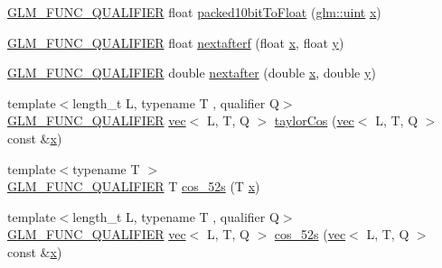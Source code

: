 \begin{DoxyCompactItemize}
\item 
\mbox{\hyperlink{setup_8hpp_a33fdea6f91c5f834105f7415e2a64407}{G\+L\+M\+\_\+\+F\+U\+N\+C\+\_\+\+Q\+U\+A\+L\+I\+F\+I\+ER}} float \mbox{\hyperlink{namespaceglm_1_1detail_afddea7fa02b61b01129777a21380edf4}{packed10bit\+To\+Float}} (\mbox{\hyperlink{group__core__precision_ga4fd29415871152bfb5abd588334147c8}{glm\+::uint}} \mbox{\hyperlink{_s_d_l__opengl_8h_ad0e63d0edcdbd3d79554076bf309fd47}{x}})
\item 
\mbox{\hyperlink{setup_8hpp_a33fdea6f91c5f834105f7415e2a64407}{G\+L\+M\+\_\+\+F\+U\+N\+C\+\_\+\+Q\+U\+A\+L\+I\+F\+I\+ER}} float \mbox{\hyperlink{namespaceglm_1_1detail_ab0eb795c482130b1d6c83470bdb031e6}{nextafterf}} (float \mbox{\hyperlink{_s_d_l__opengl_8h_ad0e63d0edcdbd3d79554076bf309fd47}{x}}, float \mbox{\hyperlink{_s_d_l__opengl_8h_a1675d9d7bb68e1657ff028643b4037e3}{y}})
\item 
\mbox{\hyperlink{setup_8hpp_a33fdea6f91c5f834105f7415e2a64407}{G\+L\+M\+\_\+\+F\+U\+N\+C\+\_\+\+Q\+U\+A\+L\+I\+F\+I\+ER}} double \mbox{\hyperlink{namespaceglm_1_1detail_a3c14f8400407e8b4cff5be12ceef2c1e}{nextafter}} (double \mbox{\hyperlink{_s_d_l__opengl_8h_ad0e63d0edcdbd3d79554076bf309fd47}{x}}, double \mbox{\hyperlink{_s_d_l__opengl_8h_a1675d9d7bb68e1657ff028643b4037e3}{y}})
\item 
{\footnotesize template$<$length\+\_\+t L, typename T , qualifier Q$>$ }\\\mbox{\hyperlink{setup_8hpp_a33fdea6f91c5f834105f7415e2a64407}{G\+L\+M\+\_\+\+F\+U\+N\+C\+\_\+\+Q\+U\+A\+L\+I\+F\+I\+ER}} \mbox{\hyperlink{structglm_1_1vec}{vec}}$<$ L, T, Q $>$ \mbox{\hyperlink{namespaceglm_1_1detail_a2cb8ceabe04661b078d956cf0a5e96c7}{taylor\+Cos}} (\mbox{\hyperlink{structglm_1_1vec}{vec}}$<$ L, T, Q $>$ const \&\mbox{\hyperlink{_s_d_l__opengl_8h_ad0e63d0edcdbd3d79554076bf309fd47}{x}})
\item 
{\footnotesize template$<$typename T $>$ }\\\mbox{\hyperlink{setup_8hpp_a33fdea6f91c5f834105f7415e2a64407}{G\+L\+M\+\_\+\+F\+U\+N\+C\+\_\+\+Q\+U\+A\+L\+I\+F\+I\+ER}} T \mbox{\hyperlink{namespaceglm_1_1detail_a09055f8d723109dc95c8cc2309e20acc}{cos\+\_\+52s}} (T \mbox{\hyperlink{_s_d_l__opengl_8h_ad0e63d0edcdbd3d79554076bf309fd47}{x}})
\item 
{\footnotesize template$<$length\+\_\+t L, typename T , qualifier Q$>$ }\\\mbox{\hyperlink{setup_8hpp_a33fdea6f91c5f834105f7415e2a64407}{G\+L\+M\+\_\+\+F\+U\+N\+C\+\_\+\+Q\+U\+A\+L\+I\+F\+I\+ER}} \mbox{\hyperlink{structglm_1_1vec}{vec}}$<$ L, T, Q $>$ \mbox{\hyperlink{namespaceglm_1_1detail_af69b36906b6e079461bf24ba03c89e73}{cos\+\_\+52s}} (\mbox{\hyperlink{structglm_1_1vec}{vec}}$<$ L, T, Q $>$ const \&\mbox{\hyperlink{_s_d_l__opengl_8h_ad0e63d0edcdbd3d79554076bf309fd47}{x}})

\end{DoxyCompactItemize}
